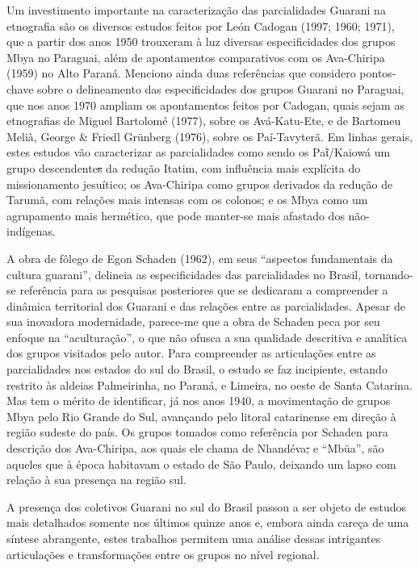 Um investimento importante na caracterização das parcialidades Guarani
na etnografia são os diversos estudos feitos por León Cadogan (1997;
1960; 1971), que a partir dos anos 1950 trouxeram à luz diversas
especificidades dos grupos Mbya no Paraguai, além de apontamentos
comparativos com os Ava-Chiripa (1959) no Alto Paraná. Menciono ainda
duas referências que considero pontos-chave sobre o delineamento das
especificidades dos grupos Guarani no Paraguai, que nos anos 1970
ampliam os apontamentos feitos por Cadogan, quais sejam as etnografias
de Miguel Bartolomé (1977), sobre os Avá-Katu-Ete, e de Bartomeu Melià,
George \& Friedl Grünberg (1976), sobre os Paí-Tavyterã. Em linhas
gerais, estes estudos vão caracterizar as parcialidades como sendo os
Paῖ/Kaiowá um grupo descendente\sout{s} da redução Itatim, com
influência mais explícita do missionamento jesuítico; os Ava-Chiripa
como grupos derivados da redução de Tarumã, com relações mais intensas
com os colonos; e os Mbya como um agrupamento mais hermético, que pode
manter-se mais afastado dos não-indígenas.

A obra de fôlego de Egon Schaden (1962), em seus ``aspectos fundamentais
da cultura guarani'', delineia as especificidades das parcialidades no
Brasil, tornando-se referência para as pesquisas posteriores que se
dedicaram a compreender a dinâmica territorial dos Guarani e das
relações entre as parcialidades. Apesar de sua inovadora modernidade,
parece-me que a obra de Schaden peca por seu enfoque na ``aculturação'',
o que não ofusca a sua qualidade descritiva e analítica dos grupos
visitados pelo autor. Para compreender as articulações entre as
parcialidades nos estados do sul do Brasil, o estudo se faz incipiente,
estando restrito às aldeias Palmeirinha, no Paraná, e Limeira, no oeste
de Santa Catarina. Mas tem o mérito de identificar, já nos anos 1940, a
movimentação de grupos Mbya pelo Rio Grande do Sul, avançando pelo
litoral catarinense em direção à região sudeste do país. Os grupos
tomados como referência por Schaden para descrição dos Ava-Chiripa, aos
quais ele chama de Nhandéva\sout{,} e ``Mbüa'', são aqueles que à época
habitavam o estado de São Paulo, deixando um lapso com relação à sua
presença na região sul.

A presença dos coletivos Guarani no sul do Brasil passou a ser objeto de
estudos mais detalhados somente nos últimos quinze anos e, embora ainda
careça de uma síntese abrangente, estes trabalhos permitem uma análise
dessas intrigantes articulações e transformações entre os grupos no
nível regional.

